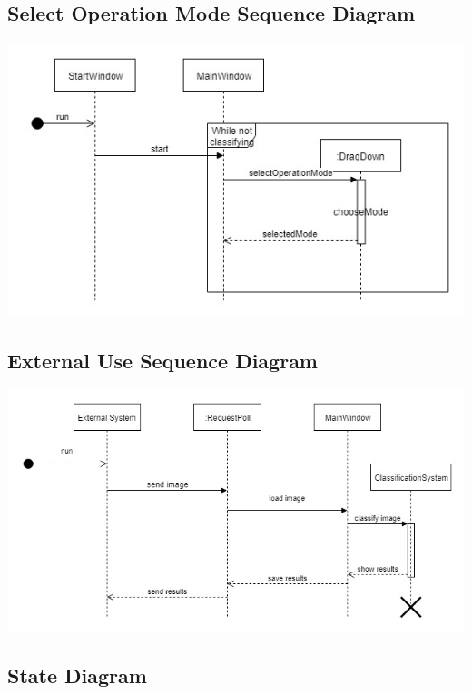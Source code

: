 \documentclass[parskip=full]{scrartcl}
\begin{document}
\pagebreak

\subsection {Select Operation Mode Sequence Diagram}

\begin{center}
\includegraphics[width=1.0\textwidth]{SelectOperationModeSequenceDiag.jpg}
\end{center}

\pagebreak

\subsection {External Use Sequence Diagram}

\begin{center}
\includegraphics[width=1.0\textwidth]{Untitled Diagram.jpg}
\end{center}

\pagebreak

\subsection {State Diagram}
\end{document}
